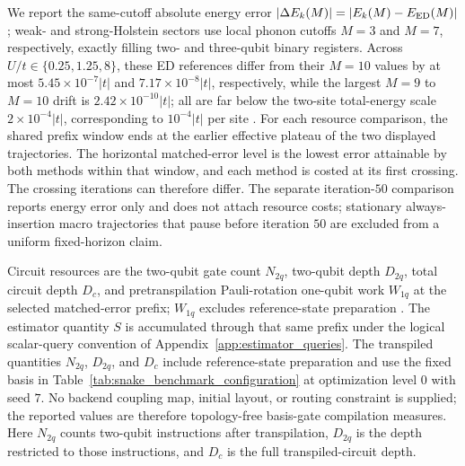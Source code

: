 \documentclass[
  reprint,
  amsmath,
  amssymb,
  aps,
  pra,
  nofootinbib,
  superscriptaddress,
  floatfix
]{revtex4-2}
\begin{document}
We report the same-cutoff absolute energy error
\(\lvert\Delta E_k(M)\rvert=\lvert E_k(M)-E_{\rm ED}(M)\rvert\)
\cite{Weisse2008}; weak- and
strong-Holstein sectors use local phonon cutoffs \(M=3\) and \(M=7\),
respectively, exactly filling two- and three-qubit binary registers. Across
\(U/t\in\{0.25,1.25,8\}\), these ED references differ from their \(M=10\)
values by at most \(5.45\times10^{-7}\lvert t\rvert\) and
\(7.17\times10^{-8}\lvert t\rvert\), respectively, while the largest
\(M=9\) to \(M=10\) drift is \(2.42\times10^{-10}\lvert t\rvert\); all are
far below the two-site total-energy scale
\(2\times10^{-4}\lvert t\rvert\), corresponding to
\(10^{-4}\lvert t\rvert\) per site
\cite{Alvertis2025HubbardVQE,LeBlanc2015HubbardBenchmarks,Qin2016AFQMCHubbard}.
For each resource comparison, the shared prefix window ends at the earlier
effective plateau of the two displayed trajectories. The horizontal
matched-error level is the lowest error attainable by both methods within
that window, and each method is costed at its first crossing. The crossing
iterations can therefore differ. The separate iteration-\(50\) comparison
reports energy error only and does not attach resource costs; stationary
always-insertion macro trajectories that pause before iteration \(50\) are
excluded from a uniform fixed-horizon claim.

Circuit resources are the two-qubit gate count \(N_{2q}\), two-qubit depth
\(D_{2q}\), total circuit depth \(D_c\), and pretranspilation Pauli-rotation
one-qubit work \(W_{1q}\) at the selected matched-error prefix; \(W_{1q}\) excludes
reference-state preparation
\cite{JavadiAbhari2024Qiskit,QiskitAlgorithmsAdaptVQE}. The estimator quantity
\(S\) is accumulated through that same prefix under the logical scalar-query
convention of Appendix~\ref{app:estimator_queries}.
The transpiled quantities \(N_{2q}\), \(D_{2q}\), and \(D_c\) include
reference-state preparation and use the fixed basis in
Table~\ref{tab:snake_benchmark_configuration} at optimization level \(0\)
with seed \(7\). No backend coupling map, initial layout, or routing
constraint is supplied; the reported values are therefore topology-free
basis-gate compilation measures. Here \(N_{2q}\) counts
two-qubit instructions after transpilation, \(D_{2q}\) is the depth restricted
to those instructions, and \(D_c\) is the full transpiled-circuit depth.
\end{document}

